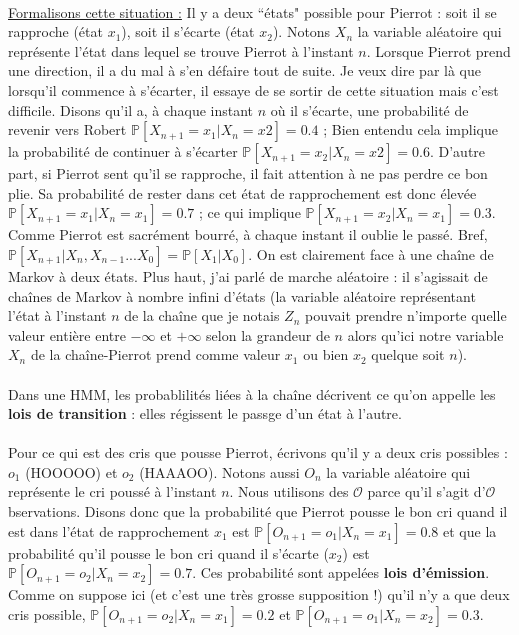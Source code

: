 \documentclass[english]{article}
\begin{document}
\\
\underline{Formalisons cette situation :} Il y a deux ``états" possible pour Pierrot : soit il se rapproche (état $x_1$), soit il s'écarte (état $x_2$). Notons $X_n$ la variable aléatoire qui représente l'état dans lequel se trouve Pierrot à l'instant $n$. Lorsque Pierrot prend une direction, il a du mal à s'en défaire tout de suite. Je veux dire par là que lorsqu'il commence à s'écarter, il essaye de se sortir de cette situation mais c'est difficile. Disons qu'il a, à chaque instant $n$ où il s'écarte, une probabilité de revenir vers Robert $\mathbb{P}[X_{n+1} = x_1 \vert X_n=x2] = 0.4$ ; Bien entendu cela implique la probabilité de continuer à s'écarter $\mathbb{P}[X_{n+1} = x_2 \vert X_n=x2] = 0.6$. D'autre part, si Pierrot sent qu'il se rapproche, il fait attention à ne pas perdre ce bon plie. Sa probabilité de rester dans cet état de rapprochement est donc élevée $\mathbb{P}[X_{n+1} = x_1 \vert X_n=x_1] = 0.7$ ; ce qui implique $\mathbb{P}[X_{n+1} = x_2 \vert X_n=x_1] = 0.3$. Comme Pierrot est sacrément bourré, à chaque instant il oublie le passé. Bref, $\mathbb{P}[X_{n+1} \vert X_n, X_{n-1} ... X_0] = \mathbb{P}[X_{1} \vert X_0]$. On est clairement face à une chaîne de Markov à deux états. Plus haut, j'ai parlé de marche aléatoire : il s'agissait de chaînes de Markov à nombre infini d'états (la variable aléatoire représentant l'état à l'instant $n$ de la chaîne que je notais $Z_n$ pouvait prendre n'importe quelle valeur entière entre $-\infty$ et $+\infty$ selon la grandeur de $n$ alors qu'ici notre variable $X_n$ de la chaîne-Pierrot prend comme valeur $x_1$ ou bien $x_2$ quelque soit $n$). \\
\\
Dans une HMM, les probablilités liées à la chaîne décrivent ce qu'on appelle les \textbf{lois de transition} : elles régissent le passge d'un état à l'autre. \\
\\
Pour ce qui est des cris que pousse Pierrot, écrivons qu'il y a deux cris possibles : $o_1$ (HOOOOO) et $o_2$ (HAAAOO). Notons aussi $O_n$ la variable aléatoire qui représente le cri poussé à l'instant $n$. Nous utilisons des $\mathcal{O}$ parce qu'il s'agit d'$\mathcal{O}$bservations. Disons donc que la probabilité que Pierrot pousse le bon cri quand il est dans l'état de rapprochement $x_1$ est $\mathbb{P}[O_{n+1} = o_1 \vert X_n=x_1] = 0.8$ et que la probabilité qu'il pousse le bon cri quand il s'écarte ($x_2$) est $\mathbb{P}[O_{n+1} = o_2 \vert X_n=x_2] = 0.7$. Ces probabilité sont appelées \textbf{lois d'émission}. Comme on suppose ici (et c'est une très grosse supposition !) qu'il n'y a que deux cris possible, $\mathbb{P}[O_{n+1} = o_2 \vert X_n=x_1] = 0.2$ et $\mathbb{P}[O_{n+1} = o_1 \vert X_n=x_2] = 0.3$. \\
\end{document}
